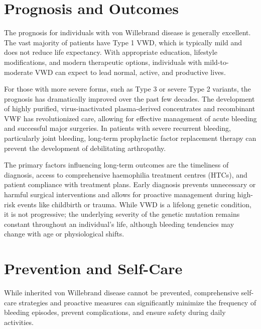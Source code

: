 \section*{Prognosis and Outcomes}
The prognosis for individuals with von Willebrand disease is generally excellent. The vast majority of patients have Type 1 VWD, which is typically mild and does not reduce life expectancy. With appropriate education, lifestyle modifications, and modern therapeutic options, individuals with mild-to-moderate VWD can expect to lead normal, active, and productive lives.

For those with more severe forms, such as Type 3 or severe Type 2 variants, the prognosis has dramatically improved over the past few decades. The development of highly purified, virus-inactivated plasma-derived concentrates and recombinant VWF has revolutionized care, allowing for effective management of acute bleeding and successful major surgeries. In patients with severe recurrent bleeding, particularly joint bleeding, long-term prophylactic factor replacement therapy can prevent the development of debilitating arthropathy.

The primary factors influencing long-term outcomes are the timeliness of diagnosis, access to comprehensive haemophilia treatment centres (HTCs), and patient compliance with treatment plans. Early diagnosis prevents unnecessary or harmful surgical interventions and allows for proactive management during high-risk events like childbirth or trauma. While VWD is a lifelong genetic condition, it is not progressive; the underlying severity of the genetic mutation remains constant throughout an individual's life, although bleeding tendencies may change with age or physiological shifts.

\section*{Prevention and Self-Care}
While inherited von Willebrand disease cannot be prevented, comprehensive self-care strategies and proactive measures can significantly minimize the frequency of bleeding episodes, prevent complications, and ensure safety during daily activities.

